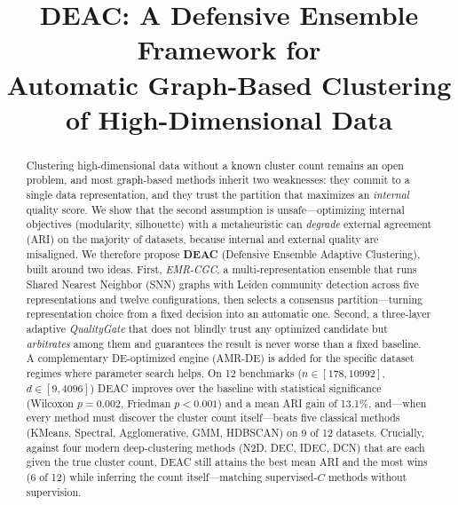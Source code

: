 \documentclass[conference]{IEEEtran}
\begin{document}
\title{DEAC: A Defensive Ensemble Framework for\\Automatic Graph-Based Clustering of High-Dimensional Data}

\author{%
}

\maketitle

\begin{abstract}
Clustering high-dimensional data without a known cluster count remains an
open problem, and most graph-based methods inherit two weaknesses: they
commit to a single data representation, and they trust the partition that
maximizes an \emph{internal} quality score. We show that the second
assumption is unsafe---optimizing internal objectives (modularity,
silhouette) with a metaheuristic can \emph{degrade} external agreement
(ARI) on the majority of datasets, because internal and external quality
are misaligned. We therefore propose \textbf{DEAC} (Defensive Ensemble
Adaptive Clustering), built around two ideas. First, \emph{EMR-CGC}, a
multi-representation ensemble that runs Shared Nearest Neighbor (SNN)
graphs with Leiden community detection across five representations and
twelve configurations, then selects a consensus partition---turning
representation choice from a fixed decision into an automatic one. Second,
a three-layer adaptive \emph{QualityGate} that does not blindly trust any
optimized candidate but \emph{arbitrates} among them and guarantees the
result is never worse than a fixed baseline. A complementary
DE-optimized engine (AMR-DE) is added for the specific dataset regimes
where parameter search helps. On 12 benchmarks ($n \in [178, 10992]$,
$d \in [9, 4096]$) DEAC improves over the baseline with statistical
significance (Wilcoxon $p{=}0.002$, Friedman $p{<}0.001$) and a mean ARI
gain of 13.1\%, and---when every method must discover the cluster count
itself---beats five classical methods (KMeans, Spectral, Agglomerative, GMM,
HDBSCAN) on 9 of 12 datasets. Crucially, against four
modern deep-clustering methods (N2D, DEC, IDEC, DCN) that are each given the
true cluster count, DEAC still attains the best mean ARI and the most wins
(6 of 12) while inferring the count itself---matching supervised-$C$ methods
without supervision.
\end{abstract}
\end{document}
